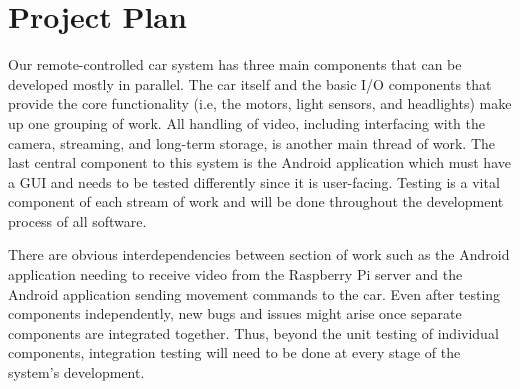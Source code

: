 \documentclass[letterpaper,12pt]{report}
\begin{document}
	\section*{Project Plan}
	\markright{}
	Our remote-controlled car system has three main components that can be
	developed mostly in parallel. The car itself and the basic I/O components
	that provide the core functionality (i.e, the motors, light sensors, and
	headlights) make up one grouping of work. All handling of video, including
	interfacing with the camera, streaming, and long-term storage, is another
	main thread of work. The last central component to this system is the
	Android application which must have a GUI and needs to be tested differently
	since it is user-facing. Testing is a vital component of each stream of work
	and will be done throughout the development process of all software.

	There are obvious interdependencies between section of work such as the
	Android application needing to receive video from the Raspberry Pi server
	and the Android application sending movement commands to the car. Even after
	testing components independently, new bugs and issues might arise once
	separate components are integrated together. Thus, beyond the unit testing
	of individual components, integration testing will need to be done at every
	stage of the system’s development.

	\setlength{\parskip}{0em}
	\renewcommand{\baselinestretch}{0}
\end{document}
